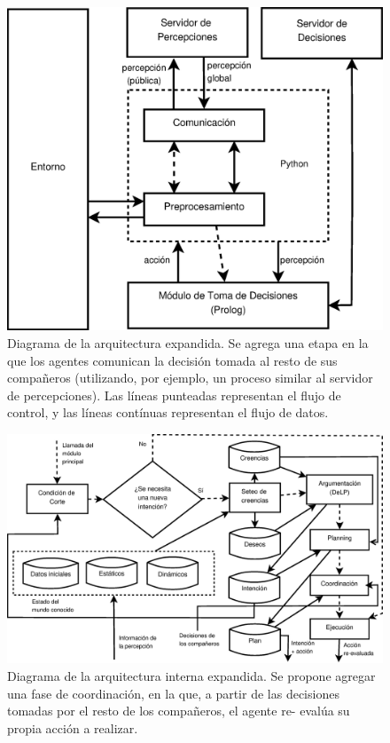 \begin{figure}[ht]
\centering
\includegraphics[scale=.3]{graficos/eps/agent_architecture_expanded.eps}
\caption{Diagrama de la arquitectura expandida. Se agrega una etapa
en la que los agentes comunican la decisión tomada al resto de sus
compañeros (utilizando, por ejemplo, un proceso similar al servidor de
percepciones). Las líneas punteadas representan el flujo de control,
y las líneas contínuas representan el flujo de datos.}
\label{fig:agent_architecture_expanded}
\end{figure}

\begin{figure}[ht]
\centering
\includegraphics[scale=.3]{graficos/eps/agent_prolog_expanded.eps}
\caption{Diagrama de la arquitectura interna expandida. 
Se propone agregar una fase de coordinación, en la que, a partir de
las decisiones tomadas por el resto de los compañeros, el agente re-
evalúa su propia acción a realizar.}
\label{fig:agent_prolog_expanded}
\end{figure}



